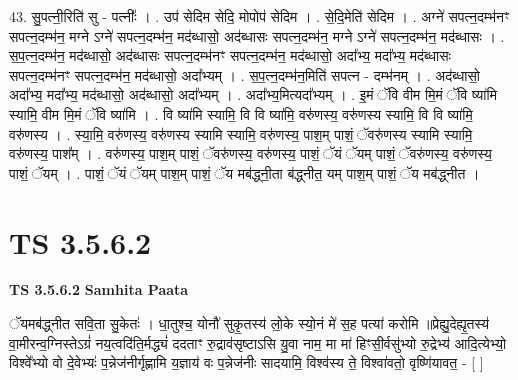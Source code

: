 \documentclass[17pt]{extarticle}
\begin{document}
43. सु॒पत्नी॒रिति॑ सु - पत्नीः᳚ । . उप॑ सेदिम सेदि॒ मोपोप॑ सेदिम । . से॒दि॒मेति॑ सेदिम । . अग्ने॑ सपत्न॒दम्भ॑नꣳ सपत्न॒दम्भ॑न॒ मग्ने ऽग्ने॑ सपत्न॒दम्भ॑न॒ मद॑ब्धासो॒ अद॑ब्धासः सपत्न॒दम्भ॑न॒ मग्ने ऽग्ने॑ सपत्न॒दम्भ॑न॒ मद॑ब्धासः । . स॒प॒त्न॒दम्भ॑न॒ मद॑ब्धासो॒ अद॑ब्धासः सपत्न॒दम्भ॑नꣳ सपत्न॒दम्भ॑न॒ मद॑ब्धासो॒ अदा᳚भ्य॒ मदा᳚भ्य॒ मद॑ब्धासः सपत्न॒दम्भ॑नꣳ सपत्न॒दम्भ॑न॒ मद॑ब्धासो॒ अदा᳚भ्यम् । . स॒प॒त्न॒दम्भ॑न॒मिति॑ सपत्न - दम्भ॑नम् । . अद॑ब्धासो॒ अदा᳚भ्य॒ मदा᳚भ्य॒ मद॑ब्धासो॒ अद॑ब्धासो॒ अदा᳚भ्यम् । . अदा᳚भ्य॒मित्यदा᳚भ्यम् । . इ॒मं ॅवि वीम मि॒मं ॅवि ष्या॑मि स्यामि॒ वीम मि॒मं ॅवि ष्या॑मि । . वि ष्या॑मि स्यामि॒ वि वि ष्या॑मि॒ वरु॑णस्य॒ वरु॑णस्य स्यामि॒ वि वि ष्या॑मि॒ वरु॑णस्य । . स्या॒मि॒ वरु॑णस्य॒ वरु॑णस्य स्यामि स्यामि॒ वरु॑णस्य॒ पाश॒म् पाशं॒ ॅवरु॑णस्य स्यामि स्यामि॒ वरु॑णस्य॒ पाश᳚म् । . वरु॑णस्य॒ पाश॒म् पाशं॒ ॅवरु॑णस्य॒ वरु॑णस्य॒ पाशं॒ ॅयं ॅयम् पाशं॒ ॅवरु॑णस्य॒ वरु॑णस्य॒ पाशं॒ ॅयम् । . पाशं॒ ॅयं ॅयम् पाश॒म् पाशं॒ ॅय मब॑द्ध्नी॒ता ब॑द्ध्नीत॒ यम् पाश॒म् पाशं॒ ॅय मब॑द्ध्नीत । \newline
\pagebreak
{}

\section{ TS 3.5.6.2 }

\textbf{TS 3.5.6.2 } \newline
\textbf{Samhita Paata} \newline

ॅयमब॑द्ध्नीत सवि॒ता सु॒केतः॑ । धा॒तुश्च॒ योनौ॑ सुकृ॒तस्य॑ लो॒के स्यो॒नं मे॑ स॒ह पत्या॑ करोमि ॥प्रेह्यु॒देह्यृ॒तस्य॑ वा॒मीरन्व॒ग्निस्तेऽग्रं॑ नय॒त्वदि॑ति॒र्मद्ध्यं॑ ददताꣳ रु॒द्राव॑सृष्टाऽसि यु॒वा नाम॒ मा मा॑ हिꣳसी॒र्वसु॑भ्यो रु॒द्रेभ्य॑ आदि॒त्येभ्यो॒ विश्वे᳚भ्यो वो दे॒वेभ्यः॑ प॒न्नेज॑नीर्गृह्णामि य॒ज्ञाय॑ वः प॒न्नेज॑नीः सादयामि॒ विश्व॑स्य ते॒ विश्वा॑वतो॒ वृष्णि॑यावत॒ - [  ] \newline
\end{document}
